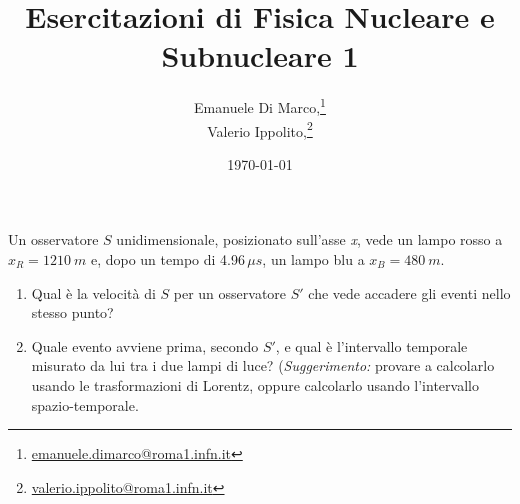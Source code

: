 \documentclass{article}
\title{Esercitazioni di Fisica Nucleare e Subnucleare 1}
\author{Emanuele Di Marco,\footnote{\href{mailto:emanuele.dimarco@roma1.infn.it}{emanuele.dimarco@roma1.infn.it}} \\
Valerio Ippolito,\footnote{\href{mailto:valerio.ippolito@roma1.infn.it}{valerio.ippolito@roma1.infn.it}} }
\date{\today}
\begin{document}
\maketitle

\begin{Exercise}[title={Applicazione delle trasformazioni di Lorentz}]
  Un osservatore $S$ unidimensionale, posizionato sull'asse \textit{x}, vede un lampo rosso a $x_R=\SI{1210}{m}$ e,
  dopo un tempo di 4.96\,$\mu s$, un lampo blu a $x_B=\SI{480}{m}$.
  \begin{enumerate}
    \item Qual \`e la velocit\`a di $S$ per un osservatore $S'$ che vede accadere gli eventi nello stesso punto?
    \item Quale evento avviene prima, secondo $S'$, e qual \`e
      l'intervallo temporale misurato da lui tra i due lampi di luce?
      (\textit{Suggerimento:} provare a calcolarlo usando le
      trasformazioni di Lorentz, oppure calcolarlo usando l'intervallo
      spazio-temporale.
  \end{enumerate}
\end{Exercise}
\end{document}
